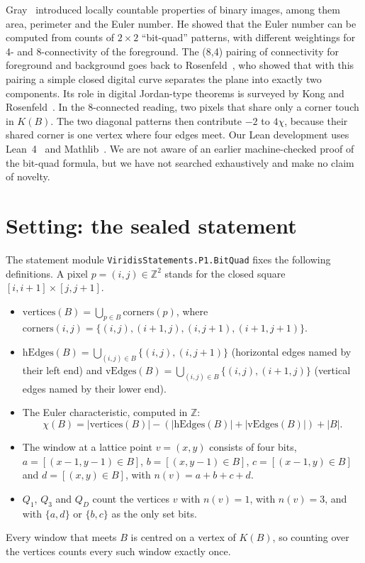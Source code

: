\documentclass[11pt]{article}
\theoremstyle{definition}
\theoremstyle{remark}
\begin{document}
Gray~\cite{Gray1971} introduced locally countable properties of binary images,
among them area, perimeter and the Euler number. He showed that the Euler number
can be computed from counts of $2\times2$ ``bit-quad'' patterns, with different
weightings for 4- and 8-connectivity of the foreground. The (8,4) pairing of
connectivity for foreground and background goes back to
Rosenfeld~\cite{Rosenfeld1970}, who showed that with this pairing a simple closed
digital curve separates the plane into exactly two components. Its role in
digital Jordan-type theorems is surveyed by Kong and
Rosenfeld~\cite{KongRosenfeld1989}.
In the 8-connected reading, two pixels that share only a corner touch in $K(B)$.
The two diagonal patterns then contribute $-2$ to $4\chi$, because their
shared corner is one vertex where four edges meet. Our Lean development uses
Lean~4~\cite{Lean4} and Mathlib~\cite{Mathlib2020}. We are not aware of an
earlier machine-checked proof of the bit-quad formula, but we have not searched
exhaustively and make no claim of novelty.

\section{Setting: the sealed statement}\label{sec:l1start}

The statement module \texttt{ViridisStatements.P1.BitQuad} fixes the following
definitions. A pixel $p=(i,j)\in\mathbb{Z}^2$ stands for the closed square
$[i,i+1]\times[j,j+1]$.
\begin{itemize}
\item $\mathrm{vertices}(B)=\bigcup_{p\in B}\mathrm{corners}(p)$, where
  $\mathrm{corners}(i,j)=\{(i,j),(i+1,j),(i,j+1),(i+1,j+1)\}$.
\item $\mathrm{hEdges}(B)=\bigcup_{(i,j)\in B}\{(i,j),(i,j+1)\}$ (horizontal
  edges named by their left end) and
  $\mathrm{vEdges}(B)=\bigcup_{(i,j)\in B}\{(i,j),(i+1,j)\}$ (vertical edges named
  by their lower end).
\item The Euler characteristic, computed in $\mathbb{Z}$:
  \[\chi(B) = |\mathrm{vertices}(B)| - (|\mathrm{hEdges}(B)|+|\mathrm{vEdges}(B)|) + |B|.\]
\item The window at a lattice point $v=(x,y)$ consists of four bits,
  $a=[(x-1,y-1)\in B]$, $b=[(x,y-1)\in B]$, $c=[(x-1,y)\in B]$ and
  $d=[(x,y)\in B]$, with $n(v)=a+b+c+d$.
\item $Q_1$, $Q_3$ and $Q_D$ count the vertices $v$ with $n(v)=1$, with
  $n(v)=3$, and with $\{a,d\}$ or $\{b,c\}$ as the only set bits.
\end{itemize}
Every window that meets $B$ is centred on a vertex of $K(B)$, so counting over
the vertices counts every such window exactly once.
\end{document}
